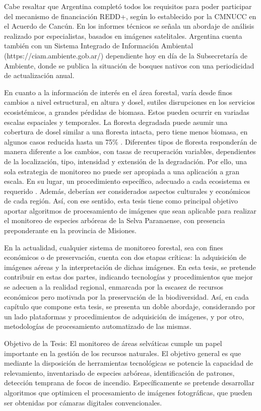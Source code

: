 Cabe resaltar que Argentina completó todos los requisitos para poder participar del mecanismo de financiación REDD+, según lo establecido por la CMNUCC en el Acuerdo de Cancún. En los informes técnicos se señala un abordaje de análisis realizado por especialistas, basados en imágenes satelitales. Argentina cuenta también con un Sistema Integrado de Información Ambiental (https://ciam.ambiente.gob.ar/) dependiente hoy en día de la Subsecretaría de Ambiente, donde se publica la situación de bosques nativos con una periodicidad de actualización anual.

En cuanto a la información de interés en el área forestal, varía desde finos cambios a nivel estructural, en altura y dosel, sutiles disrupciones en los servicios ecosistémicos, a grandes pérdidas de biomasa. Estos pueden ocurrir en variadas escalas espaciales y temporales. La floresta degradada puede asumir una cobertura de dosel similar a una floresta intacta, pero tiene menos biomasa, en algunos casos reducida hasta un 75\% \cite{change_report_2006}. Diferentes tipos de floresta responderán de manera diferente a los cambios, con tasas de recuperación variables, dependientes de la localización, tipo, intensidad y extensión de la degradación. Por ello, una sola estrategia de monitoreo no puede ser apropiada a una aplicación a gran escala. En su lugar, un procedimiento específico, adecuado a cada ecosistema es requerido \cite{mitchell_current_2017}. Además, deberían ser considerados aspectos culturales y económicos de cada región. Así, con ese sentido, esta tesis tiene como principal objetivo aportar algoritmos de procesamiento de imágenes que sean aplicable para realizar el monitoreo de especies arbóreas de la Selva Paranaense, con presencia preponderante en la provincia de Misiones.

En la actualidad, cualquier sistema de monitoreo forestal, sea con fines económicos o de preservación, cuenta con dos etapas críticas: la adquisición de imágenes aéreas y la interpretación de dichas imágenes. En esta tesis, se pretende contribuir en estas dos partes, indicando tecnologías y procedimientos que mejor se adecuen a la realidad regional, enmarcada por la escasez de recursos económicos pero motivada por la preservación de la biodiversidad. Así, en cada capítulo que compone esta tesis, se presenta un doble abordaje, considerando por un lado plataformas y  procedimientos de adquisición de imágenes, y por otro, metodologías de procesamiento automatizado de las mismas.

Objetivo de la Tesis:
El monitoreo de áreas selváticas cumple un papel importante en la gestión de los recursos naturales. El objetivo general es que mediante la disposición de herramientas tecnológicas se potencie la capacidad de relevamiento, inventariado de especies arbóreas, identificación de patrones, detección temprana de focos de incendio. Específicamente se pretende desarrollar algoritmos que optimicen el procesamiento de imágenes fotográficas, que pueden ser obtenidas por cámaras digitales convencionales.


